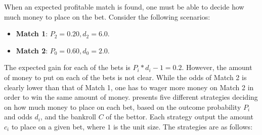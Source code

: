 When an expected profitable match is found, one must be able to decide how much money to place on the bet. Consider the following scenarios:
\begin{itemize}
    \item \textbf{Match 1}: $P_{2} = 0.20, d_{2} = 6.0$.
    \item \textbf{Match 2}: $P_{0} = 0.60, d_{0} = 2.0$.
\end{itemize}
The expected gain for each of the bets is $P_{i} * d_{i} - 1 = 0.2$. However, the amount of money to put on each of the bets is not clear. While the odds of Match 2 is clearly lower than that of Match 1, one has to wager more money on Match 2 in order to win the same amount of money. \citet{bib:langseth-2013} presents five different strategies deciding on how much money to place on each bet, based on the outcome probability $P_{i}$ and odds $d_{i}$, and the bankroll $C$ of the bettor. Each strategy output the amount $c_{i}$ to place on a given bet, where $1$ is the unit size. The strategies are as follows:
